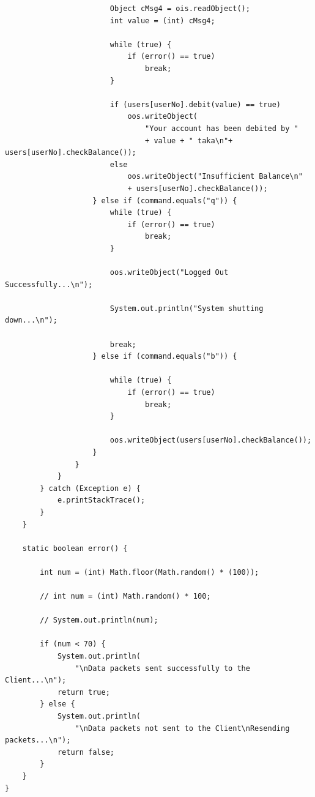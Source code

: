 \documentclass[11pt]{article}
\begin{document}
\begin{verbatim}
                        Object cMsg4 = ois.readObject();
                        int value = (int) cMsg4;

                        while (true) {
                            if (error() == true)
                                break;
                        }

                        if (users[userNo].debit(value) == true)
                            oos.writeObject(
                                "Your account has been debited by " 
                                + value + " taka\n"+ users[userNo].checkBalance());
                        else
                            oos.writeObject("Insufficient Balance\n" 
                            + users[userNo].checkBalance());
                    } else if (command.equals("q")) {
                        while (true) {
                            if (error() == true)
                                break;
                        }

                        oos.writeObject("Logged Out Successfully...\n");

                        System.out.println("System shutting down...\n");

                        break;
                    } else if (command.equals("b")) {

                        while (true) {
                            if (error() == true)
                                break;
                        }

                        oos.writeObject(users[userNo].checkBalance());
                    }
                }
            }
        } catch (Exception e) {
            e.printStackTrace();
        }
    }

    static boolean error() {

        int num = (int) Math.floor(Math.random() * (100));

        // int num = (int) Math.random() * 100;

        // System.out.println(num);

        if (num < 70) {
            System.out.println(
                "\nData packets sent successfully to the Client...\n");
            return true;
        } else {
            System.out.println(
                "\nData packets not sent to the Client\nResending packets...\n");
            return false;
        }
    }
}
\end{verbatim}
\end{document}
